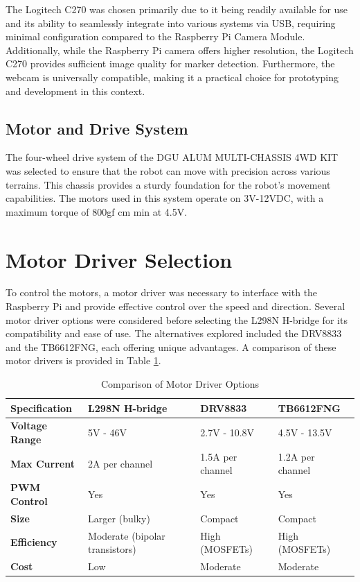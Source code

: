 The Logitech C270 was chosen primarily due to it being readily available for use and its ability to seamlessly integrate into various systems via USB, requiring minimal configuration compared to the Raspberry Pi Camera Module. Additionally, while the Raspberry Pi camera offers higher resolution, the Logitech C270 provides sufficient image quality for marker detection. Furthermore, the webcam is universally compatible, making it a practical choice for prototyping and development in this context.


\subsection{Motor and Drive System}

The four-wheel drive system of the DGU ALUM MULTI-CHASSIS 4WD KIT was selected to ensure that the robot can move with precision across various terrains. This chassis provides a sturdy foundation for the robot's movement capabilities. The motors used in this system operate on 3V-12VDC, with a maximum torque of 800gf cm min at 4.5V. 

\section*{Motor Driver Selection}

To control the motors, a motor driver was necessary to interface with the Raspberry Pi and provide effective control over the speed and direction. Several motor driver options were considered before selecting the L298N H-bridge for its compatibility and ease of use. The alternatives explored included the DRV8833 and the TB6612FNG, each offering unique advantages. A comparison of these motor drivers is provided in Table \ref{tab:motor_driver_comparison}.

\begin{table}[h!]
	\centering
	\caption{Comparison of Motor Driver Options}
	\begin{tabular}{|p{3cm}|p{3cm}|p{3cm}|p{3cm}|}
		\hline
		\textbf{Specification}        & \textbf{L298N H-bridge} & \textbf{DRV8833}   & \textbf{TB6612FNG}   \\ \hline
		\textbf{Voltage Range}        & 5V - 46V                & 2.7V - 10.8V       & 4.5V - 13.5V         \\ \hline
		\textbf{Max Current}          & 2A per channel          & 1.5A per channel   & 1.2A per channel     \\ \hline
		\textbf{PWM Control}          & Yes                     & Yes                & Yes                  \\ \hline
		\textbf{Size}                 & Larger (bulky)          & Compact            & Compact              \\ \hline
		\textbf{Efficiency}           & Moderate (bipolar transistors) & High (MOSFETs)  & High (MOSFETs)       \\ \hline
		\textbf{Cost}                 & Low                     & Moderate           & Moderate             \\ \hline
	\end{tabular}
	\label{tab:motor_driver_comparison}
\end{table}

